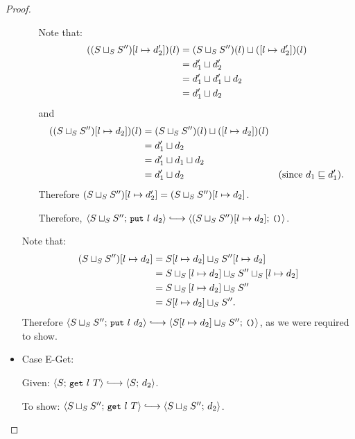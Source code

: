 \begin{proof}
\begin{itemize}
\begin{itemize}
      Note that:
      \begin{align*}
        ((S \sqcup_{S} S'')[l \mapsto d'_2])(l) &=
        (S \sqcup_{S} S'')(l) \sqcup (\left[ l \mapsto d'_2 \right])(l) \\ &=
        d'_1 \sqcup d'_2 \\ &=
        d'_1 \sqcup d'_1 \sqcup d_2 \\ &=
        d'_1 \sqcup d_2
      \end{align*}
      and
      \begin{align*}
        ((S \sqcup_{S} S'')[l \mapsto d_2])(l) &=
        (S \sqcup_{S} S'')(l) \sqcup (\left[ l \mapsto d_2 \right])(l) \\ &=
        d'_1 \sqcup d_2 \\ &=
        d'_1 \sqcup d_1 \sqcup d_2 \\ &=
        d'_1 \sqcup d_2 & \textrm{(since $d_1 \sqsubseteq d'_1$).}
      \end{align*}
      Therefore $(S \sqcup_{S} S'')[l \mapsto d'_2] =
      (S \sqcup_{S} S'')[l \mapsto d_2]$.

      Therefore, $\config{\lubstore{S}{S''}}{\putexp{l}{d_2}}
      \parstepsto
      \config{\extSRaw{(\lubstore{S}{S''})}{l}{d_2}}{\unit}$.
    \end{itemize}

    Note that:
    \begin{align*}
      (S \sqcup_{S} S'')[l \mapsto d_2] &=
      S[l \mapsto d_2] \sqcup_{S} S''[l \mapsto d_2] \\ &=
      S \sqcup_{S} \left[ l \mapsto d_2 \right] \sqcup_{S} S'' \sqcup_{S} \left[ l \mapsto d_2 \right] \\ &=
      S \sqcup_{S} \left[ l \mapsto d_2 \right] \sqcup_{S} S'' \\ &=
      S[l \mapsto d_2] \sqcup_{S} S''.
    \end{align*}
    Therefore $\config{\lubstore{S}{S''}}{\putexp{l}{d_2}} \parstepsto
    \config{\lubstore{\extSRaw{S}{l}{d_2}}{S''}}{\unit}$, as we were
    required to show.

  \item Case {\sc E-Get}:

    Given: $\config{S}{\getexp{l}{T}} \parstepsto \config{S}{d_2}$.

    To show: $\config{\lubstore{S}{S''}}{\getexp{l}{T}} \parstepsto
    \config{\lubstore{S}{S''}}{d_2}$.


\end{itemize}
\end{proof}
